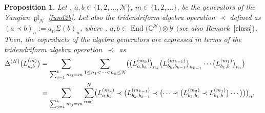 \documentclass[pdftex]{sigma}
\numberwithin{equation}{section}
\newtheorem{pro}[thm]{Proposition}
\theoremstyle{definition}
\DeclareMathOperator{\EEnd}{End}%
\begin{document}
\begin{pro} Let , $a,b \in \{1, 2,\dots, {\mathcal N } \}$, $m
\in\{1, 2, \dots\}$, be the generators of the Yangian~$\mathfrak{gl}_{\mathcal N}$~\eqref{fund2b}. Let also the tridendriform algebra operation $\prec$ defined as
$(a\prec b)_n := a_n\Sigma(b)_n $, where , $a, b \in \EEnd\bigl({\mathbb C}^{\mathcal N}\bigr) \otimes{\mathcal Y}$ $($see also Remark~$\ref{class})$. Then, the coproducts of the algebra generators are expressed in terms of the tridendriform algebra operation~$\prec$~as
\begin{align}
\Delta^{(N)}\bigl(L^{(m)}_{a,b}\bigr) &= \sum_{\sum_{j=1}^km_j=m}\sum_{1\leq n_1<\cdots < n_k\leq N} \bigl(\bigl(L^{(m_k)}_{a,b_k}\bigr)_{n_k}\bigl(L^{(m_{k-1})}_{b_k,b_{k-1}}\bigr)_{n_{k-1}} \cdots \bigl(L^{(m_1)}_{b_1, b} \bigr)_{n_1} \bigr)\cr
 &= \sum_{\sum_{j=1}^km_j=m} \sum_{n=1}^N \bigl(L^{(m_k)}_{a,b_k} \prec\bigl( L^{(m_{k-1})}_{b_k,b_{k-1}}\prec \bigl( \cdots \prec \bigl( L^{(m_2)}_{b_2, b_1}\prec L^{(m_1)}_{b_1, b} \bigr) \cdots \bigr)\bigr) \bigr)_n. \label{mine}
\end{align}
\end{pro}
\end{document}
